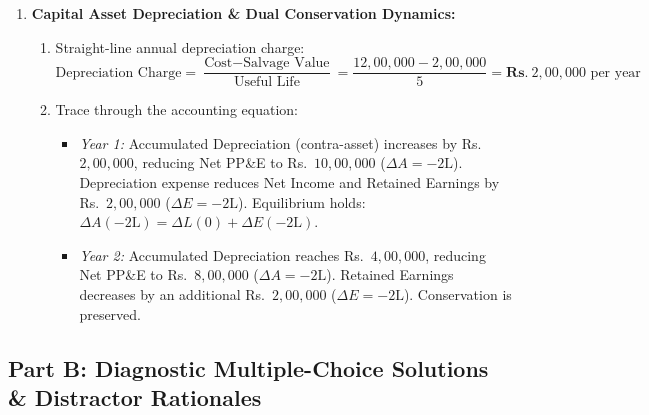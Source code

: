 \begin{enumerate}[label=\textbf{P1.\arabic*}]
    \item \textbf{Capital Asset Depreciation \& Dual Conservation Dynamics:}
    \begin{enumerate}[label=(\alph*)]
        \item Straight-line annual depreciation charge:
        \begin{equation*}
        \text{Depreciation Charge} = \frac{\text{Cost} - \text{Salvage Value}}{\text{Useful Life}} = \frac{12{,}00{,}000 - 2{,}00{,}000}{5} = \mathbf{Rs.~} 2{,}00{,}000\text{ per year}
        \end{equation*}
        \item Trace through the accounting equation:
        \begin{itemize}
            \item \textit{Year 1:} Accumulated Depreciation (contra-asset) increases by Rs.~$2{,}00{,}000$, reducing Net PP\&E to Rs.~$10{,}00{,}000$ ($\Delta A = -2\text{L}$). Depreciation expense reduces Net Income and Retained Earnings by Rs.~$2{,}00{,}000$ ($\Delta E = -2\text{L}$). Equilibrium holds: $\Delta A (-2\text{L}) = \Delta L (0) + \Delta E (-2\text{L})$.
            \item \textit{Year 2:} Accumulated Depreciation reaches Rs.~$4{,}00{,}000$, reducing Net PP\&E to Rs.~$8{,}00{,}000$ ($\Delta A = -2\text{L}$). Retained Earnings decreases by an additional Rs.~$2{,}00{,}000$ ($\Delta E = -2\text{L}$). Conservation is preserved.
        \end{itemize}
    \end{enumerate}
\end{enumerate}

\subsection*{Part B: Diagnostic Multiple-Choice Solutions \& Distractor Rationales}

